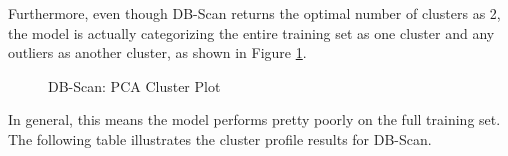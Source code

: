 \documentclass[conference]{IEEEtran}
\begin{document}
Furthermore, even though DB-Scan returns the optimal number of clusters as 2, the model is actually categorizing the entire training set as one cluster and any outliers as another cluster, as shown in Figure \ref{fig:dbscan-pca-r1}. 

 \begin{figure}[!ht]
    \begin{center}
    \end{center}
    \caption{DB-Scan: PCA Cluster Plot}
    \label{fig:dbscan-pca-r1}
\end{figure}

In general, this means the model performs pretty poorly on the full training set. The following table illustrates the cluster profile results for DB-Scan.  
\end{document}
